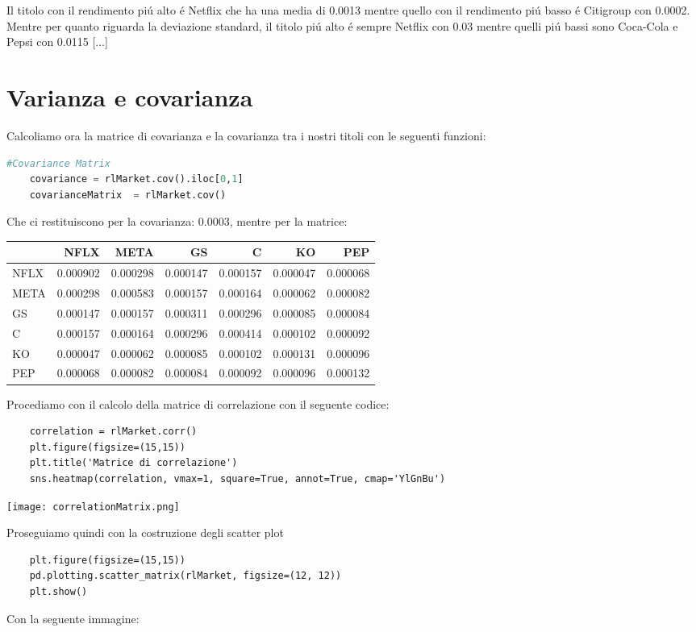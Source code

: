\documentclass{report}
\begin{document}
\noindent Il titolo con il rendimento piú alto é Netflix che ha una media di \num{0.0013} mentre quello con il rendimento piú basso é Citigroup con \num{0.0002}.
Mentre per quanto riguarda la deviazione standard, il titolo piú alto é sempre Netflix con \num{0.03} mentre quelli piú bassi sono Coca-Cola e Pepsi con \num{0.0115} [...]
\section{Varianza e covarianza}
Calcoliamo ora la matrice di covarianza e la covarianza tra i nostri titoli con le seguenti funzioni:
\begin{lstlisting}[language=python]
    #Covariance Matrix
    covariance = rlMarket.cov().iloc[0,1]
    covarianceMatrix  = rlMarket.cov()
\end{lstlisting}
Che ci restituiscono per la covarianza: \num{0.0003}, mentre per la matrice:

\begin{tabular}{lrrrrrr}
\toprule
{} &      NFLX &      META &        GS &         C &        KO &       PEP \\
\midrule
NFLX &  0.000902 &  0.000298 &  0.000147 &  0.000157 &  0.000047 &  0.000068 \\
META &  0.000298 &  0.000583 &  0.000157 &  0.000164 &  0.000062 &  0.000082 \\
GS   &  0.000147 &  0.000157 &  0.000311 &  0.000296 &  0.000085 &  0.000084 \\
C    &  0.000157 &  0.000164 &  0.000296 &  0.000414 &  0.000102 &  0.000092 \\
KO   &  0.000047 &  0.000062 &  0.000085 &  0.000102 &  0.000131 &  0.000096 \\
PEP  &  0.000068 &  0.000082 &  0.000084 &  0.000092 &  0.000096 &  0.000132 \\
\bottomrule
\end{tabular}

Procediamo con il calcolo della matrice di correlazione con il seguente codice:
\begin{lstlisting}
    correlation = rlMarket.corr()
    plt.figure(figsize=(15,15))
    plt.title('Matrice di correlazione')
    sns.heatmap(correlation, vmax=1, square=True, annot=True, cmap='YlGnBu')
\end{lstlisting}

\texttt{[image: correlationMatrix.png]}

Proseguiamo quindi con la costruzione degli scatter plot
\begin{lstlisting}
    plt.figure(figsize=(15,15))
    pd.plotting.scatter_matrix(rlMarket, figsize=(12, 12))
    plt.show()
\end{lstlisting}
Con la seguente immagine:
\end{document}
